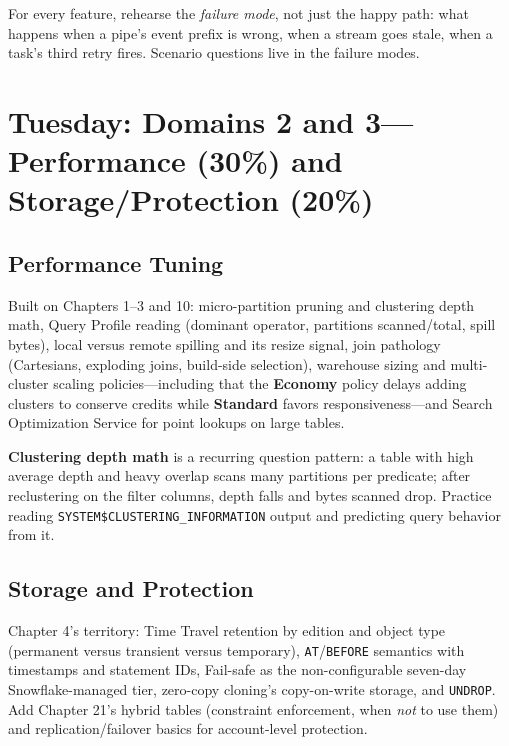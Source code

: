 \begin{tipbox}
For every feature, rehearse the \emph{failure mode}, not just the happy path: what happens when a pipe's event prefix is wrong, when a stream goes stale, when a task's third retry fires. Scenario questions live in the failure modes.
\end{tipbox}

\section{Tuesday: Domains 2 and 3---Performance (30\%) and Storage/Protection (20\%)}
\subsection{Performance Tuning}
Built on Chapters 1--3 and 10: micro-partition pruning and clustering depth math, Query Profile reading (dominant operator, partitions scanned/total, spill bytes), local versus remote spilling and its resize signal, join pathology (Cartesians, exploding joins, build-side selection), warehouse sizing and multi-cluster scaling policies---including that the \textbf{Economy} policy delays adding clusters to conserve credits while \textbf{Standard} favors responsiveness---and Search Optimization Service for point lookups on large tables.

\begin{notebox}
\textbf{Clustering depth math} is a recurring question pattern: a table with high average depth and heavy overlap scans many partitions per predicate; after reclustering on the filter columns, depth falls and bytes scanned drop. Practice reading \texttt{SYSTEM\$CLUSTERING\_INFORMATION} output and predicting query behavior from it.
\end{notebox}

\subsection{Storage and Protection}
Chapter 4's territory: Time Travel retention by edition and object type (permanent versus transient versus temporary), \texttt{AT}/\texttt{BEFORE} semantics with timestamps and statement IDs, Fail-safe as the non-configurable seven-day Snowflake-managed tier, zero-copy cloning's copy-on-write storage, and \texttt{UNDROP}. Add Chapter 21's hybrid tables (constraint enforcement, when \emph{not} to use them) and replication/failover basics for account-level protection.

